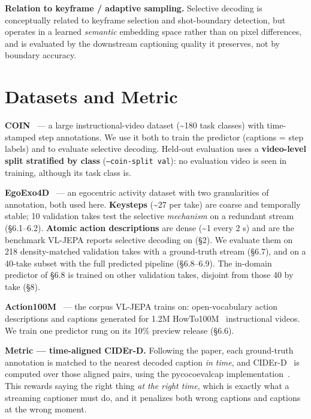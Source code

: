 \textbf{Relation to keyframe / adaptive sampling.} Selective decoding is conceptually related to keyframe selection and shot-boundary detection, but operates in a learned \emph{semantic} embedding space rather than on pixel differences, and is evaluated by the downstream captioning quality it preserves, not by boundary accuracy.

\medskip

\section{Datasets and Metric}

\textbf{COIN}~\cite{coin2019} --- a large instructional-video dataset (\textasciitilde{}180 task classes) with time-stamped step annotations. We use it both to train the predictor (captions = step labels) and to evaluate selective decoding. Held-out evaluation uses a \textbf{video-level split stratified by class} (\texttt{--coin-split val}): no evaluation video is seen in training, although its task class is.

\textbf{EgoExo4D}~\cite{egoexo4d2024} --- an egocentric activity dataset with two granularities of annotation, both used here. \textbf{Keysteps} (\textasciitilde{}27 per take) are coarse and temporally stable; 10 validation takes test the selective \emph{mechanism} on a redundant stream (\S6.1--6.2). \textbf{Atomic action descriptions} are dense (\textasciitilde{}1 every 2 s) and are the benchmark VL-JEPA reports selective decoding on (\S2). We evaluate them on 218 density-matched validation takes with a ground-truth stream (\S6.7), and on a 40-take subset with the full predicted pipeline (\S6.8--6.9). The in-domain predictor of \S6.8 is trained on other validation takes, disjoint from those 40 by take (\S8).

\textbf{Action100M}~\cite{action100m2026} --- the corpus VL-JEPA trains on: open-vocabulary action descriptions and captions generated for 1.2M HowTo100M~\cite{howto100m2019} instructional videos. We train one predictor rung on its 10\% preview release (\S6.6).

\textbf{Metric --- time-aligned CIDEr-D.} Following the paper, each ground-truth annotation is matched to the nearest decoded caption \emph{in time}, and CIDEr-D~\cite{cider2015} is computed over those aligned pairs, using the pycocoevalcap implementation~\cite{pycocoevalcap}. This rewards saying the right thing \emph{at the right time}, which is exactly what a streaming captioner must do, and it penalizes both wrong captions and captions at the wrong moment.

